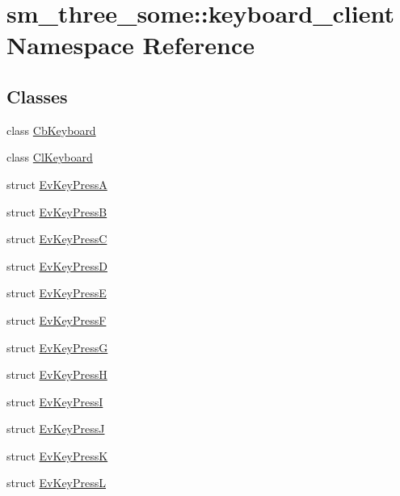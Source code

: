 \hypertarget{namespacesm__three__some_1_1keyboard__client}{}\section{sm\+\_\+three\+\_\+some\+:\+:keyboard\+\_\+client Namespace Reference}
\label{namespacesm__three__some_1_1keyboard__client}
\subsection*{Classes}
\begin{DoxyCompactItemize}
\item 
class \hyperlink{classsm__three__some_1_1keyboard__client_1_1CbKeyboard}{Cb\+Keyboard}
\item 
class \hyperlink{classsm__three__some_1_1keyboard__client_1_1ClKeyboard}{Cl\+Keyboard}
\item 
struct \hyperlink{structsm__three__some_1_1keyboard__client_1_1EvKeyPressA}{Ev\+Key\+PressA}
\item 
struct \hyperlink{structsm__three__some_1_1keyboard__client_1_1EvKeyPressB}{Ev\+Key\+PressB}
\item 
struct \hyperlink{structsm__three__some_1_1keyboard__client_1_1EvKeyPressC}{Ev\+Key\+PressC}
\item 
struct \hyperlink{structsm__three__some_1_1keyboard__client_1_1EvKeyPressD}{Ev\+Key\+PressD}
\item 
struct \hyperlink{structsm__three__some_1_1keyboard__client_1_1EvKeyPressE}{Ev\+Key\+PressE}
\item 
struct \hyperlink{structsm__three__some_1_1keyboard__client_1_1EvKeyPressF}{Ev\+Key\+PressF}
\item 
struct \hyperlink{structsm__three__some_1_1keyboard__client_1_1EvKeyPressG}{Ev\+Key\+PressG}
\item 
struct \hyperlink{structsm__three__some_1_1keyboard__client_1_1EvKeyPressH}{Ev\+Key\+PressH}
\item 
struct \hyperlink{structsm__three__some_1_1keyboard__client_1_1EvKeyPressI}{Ev\+Key\+PressI}
\item 
struct \hyperlink{structsm__three__some_1_1keyboard__client_1_1EvKeyPressJ}{Ev\+Key\+PressJ}
\item 
struct \hyperlink{structsm__three__some_1_1keyboard__client_1_1EvKeyPressK}{Ev\+Key\+PressK}
\item 
struct \hyperlink{structsm__three__some_1_1keyboard__client_1_1EvKeyPressL}{Ev\+Key\+PressL}

\end{DoxyCompactItemize}
